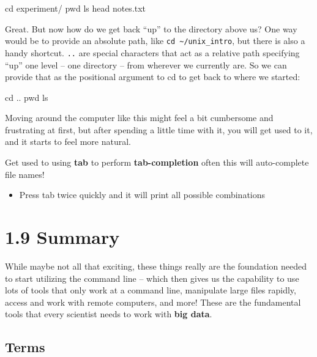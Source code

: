\documentclass[
]{book}
\newenvironment{Shaded}{\begin{snugshade}}{\end{snugshade}}
\newcommand{\BuiltInTok}[1]{#1}
\newcommand{\FunctionTok}[1]{\textcolor[rgb]{0.00,0.00,0.00}{#1}}
\newcommand{\NormalTok}[1]{#1}
\providecommand{\tightlist}{%
  \setlength{\itemsep}{0pt}\setlength{\parskip}{0pt}}
\begin{document}
\begin{Shaded}
\begin{Highlighting}[]
    \BuiltInTok{cd}\NormalTok{ experiment/}
    \BuiltInTok{pwd}
    \FunctionTok{ls}
    \FunctionTok{head}\NormalTok{ notes.txt}
\end{Highlighting}
\end{Shaded}

Great. But now how do we get back ``up'' to the directory above us? One way would be to provide an absolute path, like \texttt{cd\ \textasciitilde{}/unix\_intro}, but there is also a handy shortcut. \texttt{..} are special characters that act as a relative path specifying ``up'' one level -- one directory -- from wherever we currently are. So we can provide that as the positional argument to cd to get back to where we started:

\begin{Shaded}
\begin{Highlighting}[]
    \BuiltInTok{cd}\NormalTok{ ..}
    \BuiltInTok{pwd}
    \FunctionTok{ls}
\end{Highlighting}
\end{Shaded}

Moving around the computer like this might feel a bit cumbersome and frustrating at first, but after spending a little time with it, you will get used to it, and it starts to feel more natural.

Get used to using \textbf{tab} to perform \textbf{tab-completion} often this will auto-complete file names!

\begin{itemize}
\tightlist
\item
  Press tab twice quickly and it will print all possible combinations
\end{itemize}

\hypertarget{summary}{%
\section{1.9 Summary}\label{summary}}

While maybe not all that exciting, these things really are the foundation needed to start utilizing the command line -- which then gives us the capability to use lots of tools that only work at a command line, manipulate large files rapidly, access and work with remote computers, and more! These are the fundamental tools that every scientist needs to work with \textbf{big data}.

\hypertarget{terms}{%
\subsection{Terms}\label{terms}}
\end{document}
